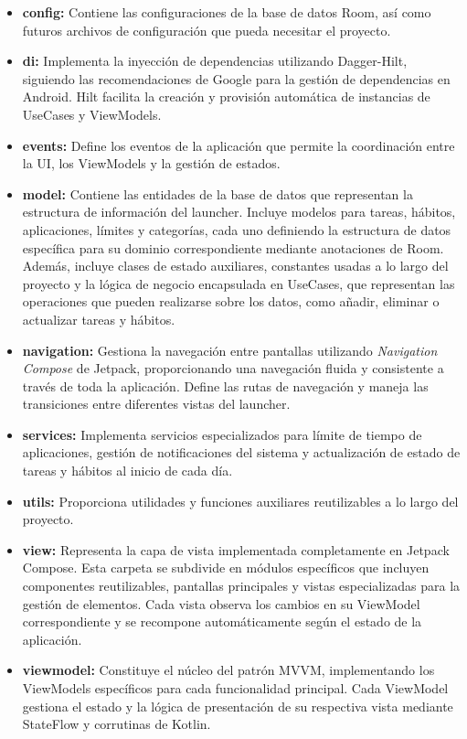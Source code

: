 \begin{itemize}
    \item \textbf{config:} Contiene las configuraciones de la base de datos Room, así como futuros archivos de configuración que pueda necesitar el proyecto.
    
    \item \textbf{di:} Implementa la inyección de dependencias utilizando Dagger-Hilt, siguiendo las recomendaciones de Google para la gestión de dependencias en Android. Hilt facilita la creación y provisión automática de instancias de UseCases y ViewModels.
    
    \item \textbf{events:} Define los eventos de la aplicación que permite la coordinación entre la UI, los ViewModels y la gestión de estados.
    
    \item \textbf{model:} Contiene las entidades de la base de datos que representan la estructura de información del launcher. Incluye modelos para tareas, hábitos, aplicaciones, límites y categorías, cada uno definiendo la estructura de datos específica para su dominio correspondiente mediante anotaciones de Room. Además, incluye clases de estado auxiliares, constantes usadas a lo largo del proyecto y la lógica de negocio encapsulada en UseCases, que representan las operaciones que pueden realizarse sobre los datos, como añadir, eliminar o actualizar tareas y hábitos.
    
    \item \textbf{navigation:} Gestiona la navegación entre pantallas utilizando \textit{Navigation Compose} de Jetpack, proporcionando una navegación fluida y consistente a través de toda la aplicación. Define las rutas de navegación y maneja las transiciones entre diferentes vistas del launcher.
    
    \item \textbf{services:} Implementa servicios especializados para límite de tiempo de aplicaciones, gestión de notificaciones del sistema y actualización de estado de tareas y hábitos al inicio de cada día.
    
    \item \textbf{utils:} Proporciona utilidades y funciones auxiliares reutilizables a lo largo del proyecto.
    
    \item \textbf{view:} Representa la capa de vista implementada completamente en Jetpack Compose. Esta carpeta se subdivide en módulos específicos que incluyen componentes reutilizables, pantallas principales y vistas especializadas para la gestión de elementos. Cada vista observa los cambios en su ViewModel correspondiente y se recompone automáticamente según el estado de la aplicación.
    
    \item \textbf{viewmodel:} Constituye el núcleo del patrón MVVM, implementando los ViewModels específicos para cada funcionalidad principal. Cada ViewModel gestiona el estado y la lógica de presentación de su respectiva vista mediante StateFlow y corrutinas de Kotlin.
\end{itemize}

